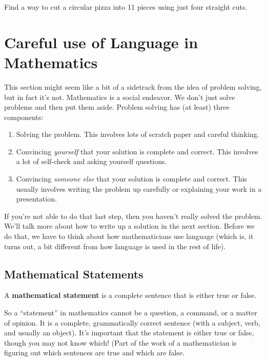 \begin{problem}
Find a way to cut a circular pizza into 11 pieces using just four straight cuts.
\end{problem}



\section{Careful use of Language in Mathematics}
This section might seem like a bit of a sidetrack from the idea of problem solving, but in fact it's not.  Mathematics is a social endeavor.  We don't just solve problems and then put them aside.  Problem solving has (at least) three components:
\begin{enumerate}
\item
Solving the problem.  This involves lots of scratch paper and careful thinking.
\item
Convincing \emph{yourself} that your solution is complete and correct.  This involves a lot of self-check and asking yourself questions.
\item
Convincing \emph{someone else} that your solution is complete and correct.  This usually involves writing the problem up carefully or explaining your work in a presentation.
\end{enumerate}

If you're not able to do that last step, then you haven't really solved the problem.  We'll talk more about how to write up a solution in the next section.  Before we do that, we have to think about how mathematicians use language (which is, it turns out, a bit different from how language is used in the rest of life).

\subsection{Mathematical Statements}

\begin{define}
A {\bf mathematical statement} is a complete sentence that is either true or false.
\end{define}

So a ``statement'' in mathematics cannot be a question, a command, or a matter of opinion.  It is a complete, grammatically correct sentence (with a subject, verb, and usually an object).  It's important that the statement is either true or false, though you may not know which!  (Part of the work of a mathematician is figuring out which sentences are true and which are false.

